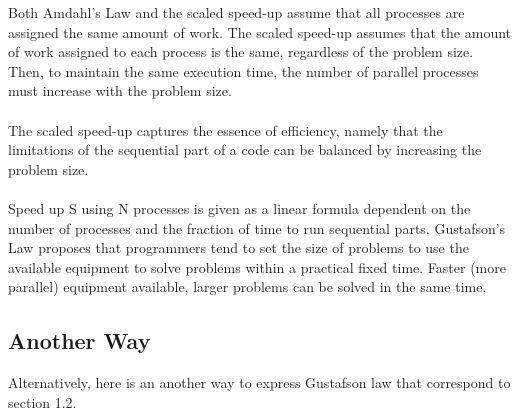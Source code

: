\documentclass[a4paper]{article}
\begin{document}
\noindent
Both Amdahl's Law and the scaled speed-up assume that all processes are assigned the same amount of work. The scaled speed-up assumes that the amount of work assigned to each process is the same, regardless of the problem size. Then, to maintain the same execution time, the number of parallel processes must increase with the problem size.
\\
\\
\noindent
The scaled speed-up captures the essence of efficiency, namely that the limitations of the sequential part of a code can be balanced by increasing the problem size.
\\
\\
\noindent
Speed up S using N processes is given as a linear formula dependent on the number of processes and the fraction of time to run sequential parts. Gustafson's Law proposes that programmers tend to set the size of problems to use the available equipment to solve problems within a practical fixed time. Faster (more parallel) equipment available, larger problems can be solved in the same time.

\subsection{Another Way}
Alternatively, here is an another way to express Gustafson law that correspond to section 1.2.
\end{document}
